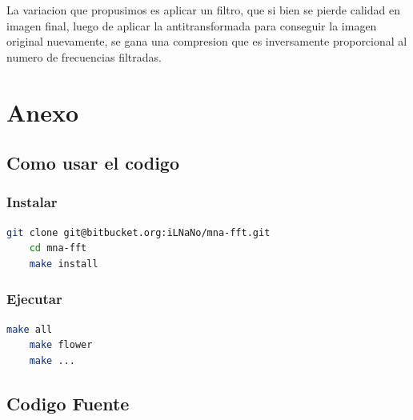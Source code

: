 \documentclass[spanish]{scrartcl}
\begin{document}
La variacion que propusimos es aplicar un filtro, que si bien se pierde calidad en imagen final, luego de aplicar la antitransformada para conseguir la imagen original nuevamente, se gana una compresion que es inversamente proporcional al numero de frecuencias filtradas.

\section{Anexo}

\subsection{Como usar el codigo}
\subsubsection{Instalar}
\begin{lstlisting}[language=bash]
    git clone git@bitbucket.org:iLNaNo/mna-fft.git
    cd mna-fft
    make install
\end{lstlisting}
\subsubsection{Ejecutar}
\begin{lstlisting}[language=bash]
    make all
    make flower
    make ...
\end{lstlisting}

\subsection{Codigo Fuente}


\break


\break




\printbibliography
\end{document}
